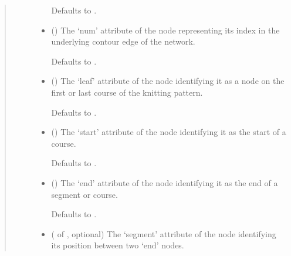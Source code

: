 \documentclass[letterpaper,10pt,english]{sphinxmanual}
\begin{document}
\begin{fulllineitems}
\begin{fulllineitems}
\begin{quote}
\begin{description}
\begin{itemize}
Defaults to .


\item {} 
 (\sphinxstyleliteralemphasis{\sphinxupquote{, }}) \textendash{} 
The ‘num’ attribute of the node representing its index in the
underlying contour edge of the network.

Defaults to .


\item {} 
 (\sphinxstyleliteralemphasis{\sphinxupquote{, }}) \textendash{} 
The ‘leaf’ attribute of the node identifying it as a node on the
first or last course of the knitting pattern.

Defaults to .


\item {} 
 (\sphinxstyleliteralemphasis{\sphinxupquote{, }}) \textendash{} 
The ‘start’ attribute of the node identifying it as the start of
a course.

Defaults to .


\item {} 
 (\sphinxstyleliteralemphasis{\sphinxupquote{, }}) \textendash{} 
The ‘end’ attribute of the node identifying it as the end of a
segment or course.

Defaults to .


\item {} 
 ( of , optional) \textendash{} 
The ‘segment’ attribute of the node identifying its position between
two ‘end’ nodes.


\end{itemize}
\end{description}
\end{quote}
\end{fulllineitems}
\end{fulllineitems}
\end{document}
